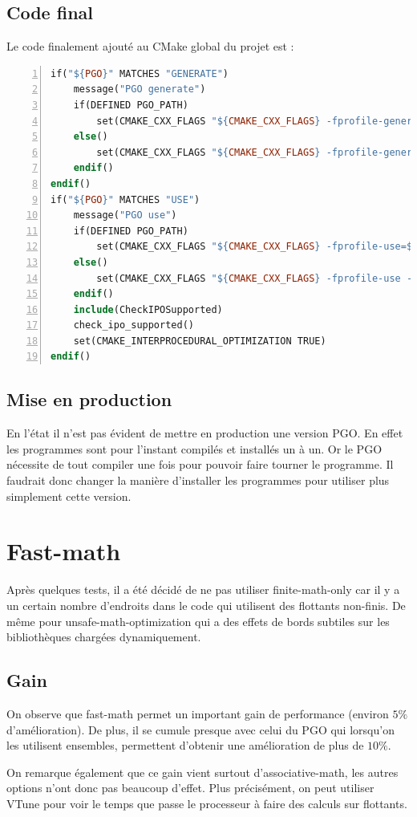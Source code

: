 \documentclass[a4paper]{report}
\begin{document}
\subsection{Code final}
Le code finalement ajouté au CMake global du projet est :
\begin{lstlisting}[language=make,numbers=left]
if("${PGO}" MATCHES "GENERATE")
	message("PGO generate")
	if(DEFINED PGO_PATH)
		set(CMAKE_CXX_FLAGS "${CMAKE_CXX_FLAGS} -fprofile-generate=${PGO_PATH}")
	else()
		set(CMAKE_CXX_FLAGS "${CMAKE_CXX_FLAGS} -fprofile-generate")
	endif()
endif()
if("${PGO}" MATCHES "USE")
	message("PGO use")
	if(DEFINED PGO_PATH)
		set(CMAKE_CXX_FLAGS "${CMAKE_CXX_FLAGS} -fprofile-use=${PGO_PATH} -fprofile-correction")
	else()
		set(CMAKE_CXX_FLAGS "${CMAKE_CXX_FLAGS} -fprofile-use -fprofile-correction")
	endif()
	include(CheckIPOSupported)
	check_ipo_supported()
	set(CMAKE_INTERPROCEDURAL_OPTIMIZATION TRUE)
endif()
\end{lstlisting}

\subsection{Mise en production}
En l'état il n'est pas évident de mettre en production une version PGO.
En effet les programmes sont pour l'instant compilés et installés un à un.
Or le PGO nécessite de tout compiler une fois pour pouvoir faire tourner le programme.
Il faudrait donc changer la manière d'installer les programmes pour utiliser plus simplement cette version.

\section{Fast-math}
Après quelques tests, il a été décidé de ne pas utiliser finite-math-only car il y a un certain nombre d'endroits dans le code qui utilisent des flottants non-finis.
De même pour unsafe-math-optimization qui a des effets de bords subtiles sur les bibliothèques chargées dynamiquement.

\subsection{Gain}
On observe que fast-math permet un important gain de performance (environ $5\%$ d'amélioration).
De plus, il se cumule presque avec celui du PGO qui lorsqu'on les utilisent ensembles, permettent d'obtenir une amélioration de plus de $10\%$.

On remarque également que ce gain vient surtout d'associative-math, les autres options n'ont donc pas beaucoup d'effet.
Plus précisément, on peut utiliser VTune pour voir le temps que passe le processeur à faire des calculs sur flottants.
\end{document}
